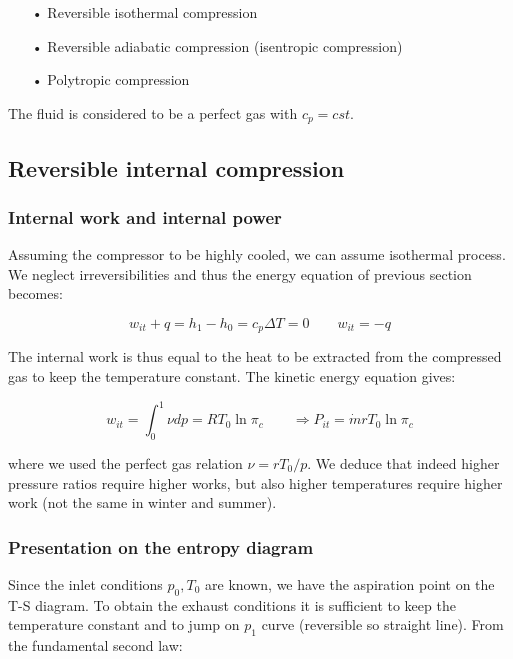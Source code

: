 \begin{itemize}
\item[•] Reversible isothermal compression 
\item[•] Reversible adiabatic compression (isentropic compression)
\item[•] Polytropic compression
\end{itemize}

The fluid is considered to be a perfect gas with $c_p = cst$.

\subsection{Reversible internal compression}
\subsubsection{Internal work and internal power}
Assuming the compressor to be highly cooled, we can assume isothermal process. We neglect irreversibilities and thus the energy equation of previous section becomes: 

\begin{equation}
w_{it} + q = h_1 -h_0 = c_p\Delta T = 0 \qquad w_{it} = -q
\end{equation}

The internal work is thus equal to the heat to be extracted from the compressed gas to keep the temperature constant. The kinetic energy equation gives: 

\begin{equation}
w_{it} = \int _0 ^1 \nu dp = RT_0 \ln \pi _c \qquad \Rightarrow P_{it} = \dot{m} rT_0 \ln \pi _c
\end{equation}

where we used the perfect gas relation $\nu = rT_0/p$. We deduce that indeed higher pressure ratios require higher works, but also higher temperatures require higher work (not the same in winter and summer). 

\subsubsection{Presentation on the entropy diagram}
Since the inlet conditions $p_0,T_0$ are known, we have the aspiration point on the T-S diagram. To obtain the exhaust conditions it is sufficient to keep the temperature constant and to jump on $p_1$ curve (reversible so straight line).  From the fundamental second law: 

